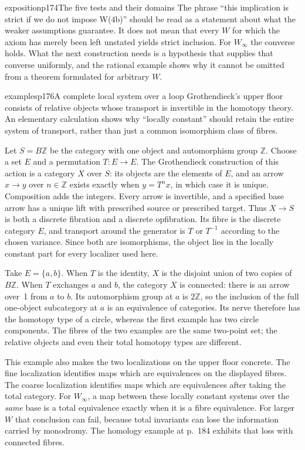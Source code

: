 \begin{dcomment}{exposition}{p174}{The five tests and their domains}
The phrase ``this implication is strict if we do not impose W(4b)'' should be read as a statement about what the weaker assumptions guarantee. It does not mean that every $W$ for which the axiom has merely been left unstated yields strict inclusion. For $W_\infty$ the converse holds. What the next construction needs is a hypothesis that supplies that converse uniformly, and the rational example shows why it cannot be omitted from a theorem formulated for arbitrary $W$.
\end{dcomment}

\begin{dcomment}{examples}{p176}{A complete local system over a loop}
Grothendieck's upper floor consists of relative objects whose transport is invertible in the homotopy theory. An elementary calculation shows why ``locally constant'' should retain the entire system of transport, rather than just a common isomorphism class of fibres.

Let $S=B\mathbb Z$ be the category with one object and automorphism group $\mathbb Z$. Choose a set $E$ and a permutation $T:E\to E$. The Grothendieck construction of this action is a category $X$ over $S$: its objects are the elements of $E$, and an arrow $x\to y$ over $n\in\mathbb Z$ exists exactly when $y=T^n x$, in which case it is unique. Composition adds the integers. Every arrow is invertible, and a specified base arrow has a unique lift with prescribed source or prescribed target. Thus $X\to S$ is both a discrete fibration and a discrete opfibration. Its fibre is the discrete category $E$, and transport around the generator is $T$ or $T^{-1}$ according to the chosen variance. Since both are isomorphisms, the object lies in the locally constant part for every localizer used here.

Take $E=\{a,b\}$. When $T$ is the identity, $X$ is the disjoint union of two copies of $B\mathbb Z$. When $T$ exchanges $a$ and $b$, the category $X$ is connected: there is an arrow over~1 from $a$ to $b$. Its automorphism group at $a$ is $2\mathbb Z$, so the inclusion of the full one-object subcategory at $a$ is an equivalence of categories. Its nerve therefore has the homotopy type of a circle, whereas the first example has two circle components. The fibres of the two examples are the same two-point set; the relative objects and even their total homotopy types are different.

This example also makes the two localizations on the upper floor concrete. The fine localization identifies maps which are equivalences on the displayed fibres. The coarse localization identifies maps which are equivalences after taking the total category. For $W_\infty$, a map between these locally constant systems over the \emph{same} base is a total equivalence exactly when it is a fibre equivalence. For larger $W$ that conclusion can fail, because total invariants can lose the information carried by monodromy. The homology example at p.~184 exhibits that loss with connected fibres.


\end{dcomment}
